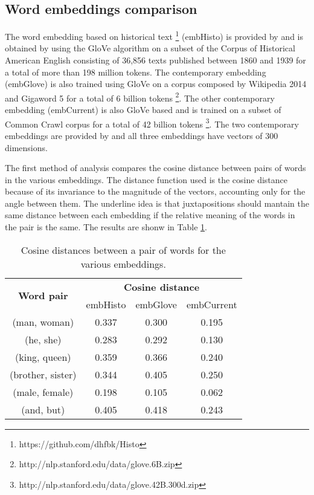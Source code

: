 \documentclass[runningheads]{llncs}
\begin{document}
\subsection{Word embeddings comparison}

The word embedding based on historical text \footnote{https://github.com/dhfbk/Histo} (embHisto) is provided by \cite{histo} and is obtained by using the GloVe algorithm on a subset of the Corpus of Historical American English consisting of 36,856 texts published between 1860 and 1939 for a total of more than 198 million tokens. The contemporary embedding (embGlove) is also trained using GloVe on a corpus composed by Wikipedia 2014 and Gigaword 5 for a total of 6 billion tokens \footnote{http://nlp.stanford.edu/data/glove.6B.zip}. The other contemporary embedding (embCurrent) is also GloVe based and is trained on a subset of Common Crawl corpus for a total of 42 billion tokens \footnote{http://nlp.stanford.edu/data/glove.42B.300d.zip}. The two contemporary embeddings are provided by \cite{glove} and all three embeddings have vectors of 300 dimensions.

The first method of analysis compares the cosine distance between pairs of words in the various embeddings. The distance function used is the cosine distance because of its invariance to the magnitude of the vectors, accounting only for the angle between them. The underline idea is that juxtapositions should mantain the same distance between each embedding if the relative meaning of the words in the pair is the same. The results are shonw in Table \ref{tab:juxtapos}.

\begin{table}
\centering
\caption{Cosine distances between a pair of words for the various embeddings.}
\label{tab:juxtapos}
\begin{tabular}{|c|c|c|c|}
\hline
\multirow{2}{*}{{\bfseries Word pair}} & \multicolumn{3}{|c|}{{\bfseries Cosine distance}}\\\cline{2-4}
&embHisto&embGlove&embCurrent\\
\hline
(man, woman) &  0.337 & 0.300 & 0.195\\
(he, she) & 0.283 & 0.292 & 0.130\\
(king, queen) & 0.359 & 0.366 & 0.240\\
(brother, sister) & 0.344 & 0.405 & 0.250\\
(male, female) & 0.198 & 0.105 & 0.062\\
(and, but) & 0.405 & 0.418 & 0.243\\
\hline
\end{tabular}
\end{table}
\end{document}
